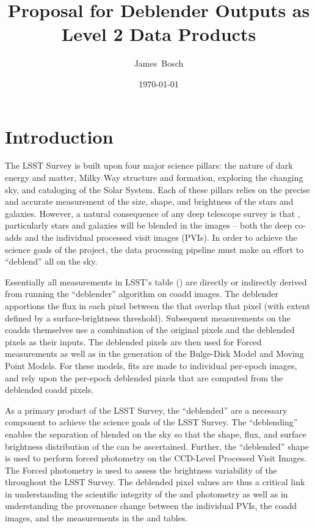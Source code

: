 \documentclass[DM,lsstdraft,toc]{lsstdoc}
\title[Deblender Data Products]{Proposal for Deblender Outputs as Level 2 Data Products}
\author{
James~Bosch
}
\date{\today}
\begin{document}
\maketitle

\section{Introduction}
The LSST Survey is built upon four major science pillars: the nature of dark energy and matter, Milky Way structure and formation, exploring the changing sky, and cataloging of the Solar System.  Each of these pillars relies on the precise and accurate measurement of the size, shape, and brightness of the stars and galaxies.  However, a natural consequence of any deep telescope survey is that \Objects, particularly stars and galaxies will be blended in the images -- both the deep co-adds and the individual processed visit images (PVIs).  In order to achieve the science goals of the project, the data processing pipeline must make an effort to ``deblend'' all \Objects on the sky.

Essentially all measurements in LSST's \Object table (\DPDD) are directly or indirectly derived from running the ``deblender'' algorithm on coadd images.  The deblender apportions the flux in each pixel between the \Objects that overlap that pixel (with \Object extent defined by a surface-brightness threshold).  Subsequent measurements on the coadds themselves use a combination of the original pixels and the deblended pixels as their inputs.  The deblended pixels are then used for Forced \Source measurements as well as in the generation of the Bulge-Disk Model and Moving Point \Source Models.  For these models, fits are made to individual per-epoch images, and rely upon the per-epoch deblended pixels that are computed from the deblended coadd pixels.

As a primary product of the LSST Survey, the ``deblended'' \Objects are a necessary component to achieve the science goals of the LSST Survey.  The ``deblending'' enables the separation of blended \Objects on the sky so that the shape, flux, and surface brightness distribution of the \Objects can be ascertained.  Further, the ``deblended'' shape is used to perform forced photometry on the CCD-Level Processed Visit Images.  The Forced \Source photometry is used to assess the brightness variability of the \Objects throughout the LSST Survey.  The deblended pixel values are thus a critical link in understanding the scientific integrity of the \Object and \ForcedSource photometry as well as in understanding the provenance change between the individual PVIs, the coadd images, and the measurements in the \Object and \ForcedSource tables.
\end{document}

